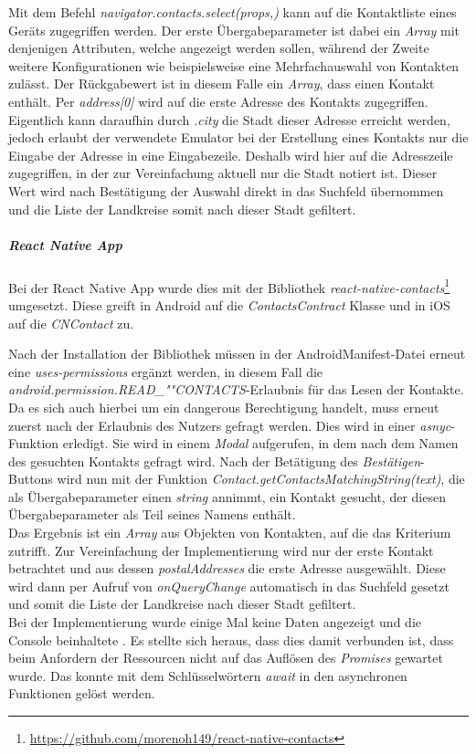 Mit dem Befehl \textit{navigator.contacts.select(props,{})} kann auf die Kontaktliste eines Geräts zugegriffen werden.
Der erste Übergabeparameter ist dabei ein \textit{Array} mit denjenigen Attributen, welche angezeigt werden sollen, während der Zweite weitere Konfigurationen wie beispielsweise eine Mehrfachauswahl von Kontakten zulässt.
Der Rückgabewert ist in diesem Falle ein \textit{Array}, dass einen Kontakt enthält.
Per \textit{address[0]} wird auf die erste Adresse des Kontakts zugegriffen.
Eigentlich kann daraufhin durch \textit{.city} die Stadt dieser Adresse erreicht werden, jedoch erlaubt der verwendete Emulator bei der Erstellung eines Kontakts nur die Eingabe der Adresse in eine Eingabezeile.
Deshalb wird hier auf die Adresszeile zugegriffen, in der zur Vereinfachung aktuell nur die Stadt notiert ist.
Dieser Wert wird nach Bestätigung der Auswahl direkt in das Suchfeld übernommen und die Liste der Landkreise somit nach dieser Stadt gefiltert.

\subparagraph{React Native App\\}
Bei der React Native App wurde dies mit der Bibliothek \textit{react-native-contacts}\footnote{\url{https://github.com/morenoh149/react-native-contacts}} umgesetzt.
Diese greift in Android auf die \textit{ContactsContract} Klasse und in iOS auf die \textit{CNContact} zu.

Nach der Installation der Bibliothek müssen in der AndroidManifest-Datei erneut eine \textit{uses-permissions} ergänzt werden, in diesem Fall die \textit{android.permission.READ\_""CONTACTS}-Erlaubnis für das Lesen der Kontakte.
Da es sich auch hierbei um ein \glqq dangerous\grqq{} Berechtigung handelt, muss erneut zuerst nach der Erlaubnis des Nutzers gefragt werden.
Dies wird in einer \textit{asnyc}-Funktion erledigt.
Sie wird in einem \textit{Modal} aufgerufen, in dem nach dem Namen des gesuchten Kontakts gefragt wird.
Nach der Betätigung des \textit{Bestätigen}-Buttons wird nun mit der Funktion \textit{Contact.getContactsMatchingString(text)}, die als Übergabeparameter einen \textit{string} annimmt, ein Kontakt gesucht, der diesen Übergabeparameter als Teil seines Namens enthält.\\
Das Ergebnis ist ein \textit{Array} aus Objekten von Kontakten, auf die das Kriterium zutrifft.
Zur Vereinfachung der Implementierung wird nur der erste Kontakt betrachtet und aus dessen \textit{postalAddresses} die erste Adresse ausgewählt.
Diese wird dann per Aufruf von \textit{onQueryChange} automatisch in das Suchfeld gesetzt und somit die Liste der Landkreise nach dieser Stadt gefiltert.\\
Bei der Implementierung wurde einige Mal keine Daten angezeigt und die Console beinhaltete \grqq{}.
Es stellte sich heraus, dass dies damit verbunden ist, dass beim Anfordern der Ressourcen nicht auf das Auflösen des \textit{Promises} gewartet wurde.
Das konnte mit dem Schlüsselwörtern \textit{await} in den asynchronen Funktionen gelöst werden.

